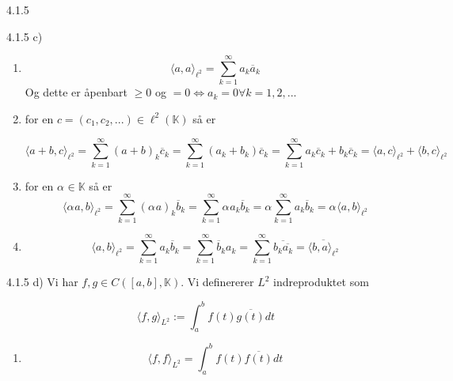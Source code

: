 \documentclass[a4paper,norsk]{article}
\renewcommand{\geq}{\geqslant}
\begin{document}
\begin{oppgavebox}{4.1.5}{}
\begin{proofbox}{4.1.5 c)}{}
    \begin{enumerate}
        \item \[
            \langle a, a \rangle _{\ell^2} = \sum_{ k=1 }^{ \infty } a_k \overline{a}_k
        \]
        Og dette er åpenbart $ \geq 0 $ og $ =0 \Longleftrightarrow a_k=0 \forall k=1,2,...$  

        \item for en $ c = \left( c_1, c_2, ... \right) \in \ell^2 (\mathbb{K}) $ så er
        
        \[
            \langle a+b, c \rangle _{\ell^2} = \sum_{ k=1 }^{ \infty } \left( a + b \right) _k \overline{c}_k 
            = \sum_{ k=1 }^{ \infty } \left( a_k + b_k \right) \overline{c}_k 
            = \sum_{ k=1 }^{ \infty } a_k \overline{c}_k + b_k \overline{c}_k 
            = \langle a, c \rangle _{\ell^2} + \langle b, c \rangle _{\ell^2}
        \]
        

        \item for en $ \alpha_{}^{} \in \mathbb{K} $ så er  \[
            \langle \alpha_{}^{} a, b \rangle_{ \ell^2 } = \sum_{ k=1 }^{ \infty } \left( \alpha_{}^{} a \right) _k \overline{b}_k 
            = \sum_{ k=1 }^{ \infty } \alpha_{}^{} a_k \overline{b}_k 
            = \alpha_{}^{} \sum_{ k=1 }^{ \infty } a_k \overline{b}_k 
            = \alpha_{}^{} \langle a, b \rangle_{ \ell^2 } 
        \]
        

        \item \[
            \langle a, b \rangle_{ \ell^2 } = \sum_{ k=1 }^{ \infty } a_k \overline{b}_k 
            = \sum_{ k=1 }^{ \infty } \overline{b}_k a_k 
            = \sum_{ k=1 }^{ \infty } \overline{b_k \overline{a_k}}
            = \overline{ \langle b, a \rangle_{ \ell^2 } }
        \]
        
    \end{enumerate}
\end{proofbox}

\begin{proofbox}{4.1.5 d)}{}
    Vi har $ f, g \in C \left( \left[ a, b \right], \mathbb{K} \right)   $. Vi definererer $ L^2 $ indreproduktet som
    
    \[
        \langle f, g \rangle_{ L^2 } := \int_{a}^{b} f(t) \overline{g(t)} dt
    \]

    \begin{enumerate}
        \item \[
            \langle f, f \rangle_{ L^2 } = \int_{a}^{b} f(t) \overline{f(t)} dt
        \]
        

\end{enumerate}
\end{proofbox}
\end{oppgavebox}
\end{document}
